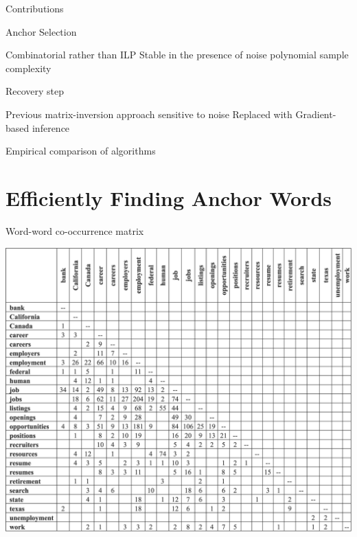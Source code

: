 \documentclass{lecture}
\begin{document}
\begin{plain}{Contributions}
\begin{enumerate}
	\p Anchor Selection
	\begin{itemize}
		\p Combinatorial rather than ILP
		\p Stable in the presence of noise
		\p polynomial sample complexity
	\end{itemize}
	
	\p Recovery step
	\begin{itemize}
		\p Previous matrix-inversion approach sensitive to noise
		\p Replaced with Gradient-based inference
	\end{itemize}
	
	\p Empirical comparison of algorithms
\end{enumerate}
\end{plain}

\section[Anchor Selection]{Efficiently Finding Anchor Words}
\begin{plain}{Word-word co-occurrence matrix}
\begin{center}
\includegraphics[scale=0.7]{figs/word_word}
\end{center}
\end{plain}
\end{document}
